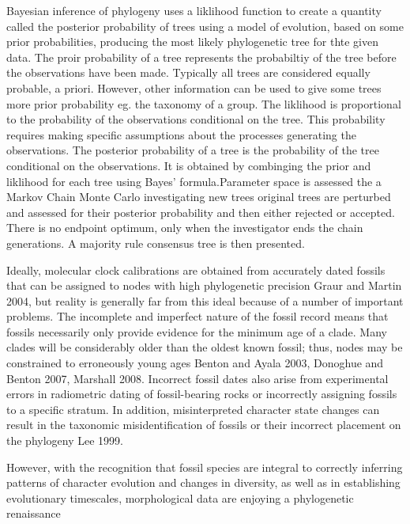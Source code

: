 \documentclass[11pt,letterpaper]{article}
\begin{document}
Bayesian inference of phylogeny uses a liklihood function to create a quantity called the posterior probability of trees using a model of evolution, based on some prior probabilities, producing the most likely phylogenetic tree for thte given data. The proir probability of a tree represents the probabiltiy of the tree before the observations have been made. Typically all trees are considered equally probable, a priori. However, other information can be used to give some trees more prior probability eg. the taxonomy of a group. The liklihood is proportional to the probability of the observations conditional on the tree. This probability requires making specific assumptions about the processes generating the observations. The posterior probability of a tree is the probability of the tree conditional on the observations. It is obtained by combinging the prior and liklihood for each tree using Bayes' formula.Parameter space is assessed the a Markov Chain Monte Carlo investigating new trees original trees are perturbed and assessed for their posterior probability and then either rejected or accepted. There is no endpoint optimum, only when the investigator ends the chain generations. A majority rule consensus tree is then presented.

Ideally, molecular clock calibrations are obtained from accurately dated fossils that can be assigned to nodes with high phylogenetic precision Graur and Martin 2004, but reality is generally far from this ideal because of a number of important problems. The incomplete and imperfect nature of the fossil record means that fossils necessarily only provide evidence for the minimum age of a clade. Many clades will be considerably older than the oldest known fossil; thus, nodes may be constrained to erroneously young ages Benton and Ayala 2003, Donoghue and Benton 2007, Marshall 2008. Incorrect fossil dates also arise from experimental errors in radiometric dating of fossil-bearing rocks or incorrectly assigning fossils to a specific stratum. In addition, misinterpreted character state changes can result in the taxonomic misidentification of fossils or their incorrect placement on the phylogeny Lee 1999. 

\citep{lee2015morphological}

However, with the recognition that fossil species are integral to correctly inferring patterns of character evolution and changes in diversity, as well as in establishing evolutionary timescales, morphological data are enjoying a phylogenetic renaissance 
\end{document}
